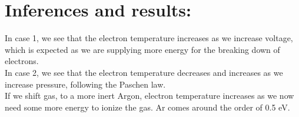 \documentclass[]{report}[12 pt]
\begin{document}
\section*{Inferences and results:}
In case 1, we see that the electron temperature increases as we increase voltage, which is expected as we are supplying more energy for the breaking down of electrons.\\
In case 2, we see that the electron temperature decreases and increases as we increase pressure, following the Paschen law.\\
If we shift gas, to a more inert Argon, electron temperature increases as we now need some more energy to ionize the gas. Ar comes around the order of 0.5 eV.
\end{document}

